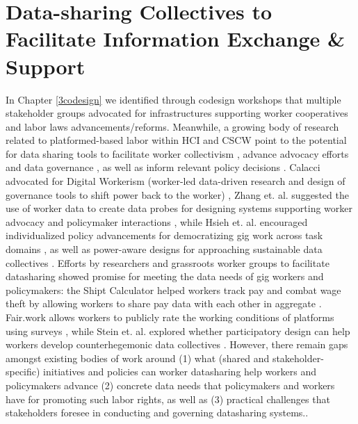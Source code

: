 \chapter{Data-sharing Collectives to Facilitate Information Exchange \& Support} \label{support}
In Chapter \ref{3codesign} we identified through codesign workshops that multiple stakeholder groups advocated for infrastructures supporting worker cooperatives and labor laws advancements/reforms. 
Meanwhile, a growing body of research related to platformed-based labor within HCI and CSCW point to the potential for data sharing tools to facilitate worker collectivism \cite{end, collectives, chiworkli, uuapp}, advance advocacy efforts \cite{raorideshare, leverage2022gig} and data governance \cite{datagovernance, zhang24demystifying}, as well as inform relevant policy decisions \cite{zhang2023stakeholder}. 
Calacci advocated for Digital Workerism (worker-led data-driven research and design of governance tools to shift power back to the worker) \cite{end}, Zhang et. al. suggested the use of worker data to create data probes for designing systems supporting worker advocacy \cite{zhang2023stakeholder} and policymaker interactions \cite{policy_probes}, while Hsieh et. al. encouraged individualized policy advancements for democratizing gig work {across task domains} \cite{4Qr5}{, as well as power-aware designs for approaching sustainable data collectives \cite{collectives}}. 
Efforts by researchers and grassroots worker groups to facilitate datasharing {showed promise} for meeting the data needs of gig workers and policymakers: the Shipt Calculator helped workers track pay and combat wage theft by allowing workers to share pay data with each other in aggregate \cite{6B4U}. Fair.work allows workers to publicly rate the working conditions of platforms using surveys \cite{GgXq}, while Stein et. al. explored whether participatory design can help workers develop counterhegemonic data collectives \cite{uuapp}. 
However, {there remain gaps amongst existing bodies of work around (1) what (shared and stakeholder-specific) initiatives and policies can worker datasharing help workers and policymakers advance (2)} concrete data needs  that policymakers and workers have for {promoting such labor rights, as well as (3) practical challenges that stakeholders foresee in conducting and governing datasharing systems.}. 

